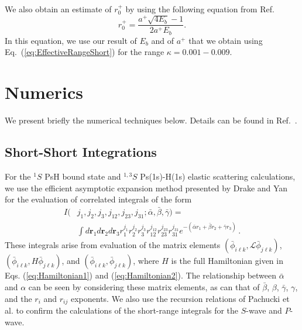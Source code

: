 \documentclass[preprint,showpacs,showkeys,preprintnumbers,amsmath,amssymb,longbibliography,pra,aps]{revtex4-1}
\begin{document}
We also obtain an estimate of $r_0^+$ by using the following
equation from Ref.~\cite{Blackwood2002}
\begin{equation}
\label{eq:BlackwoodERT}
r_0^+ = \frac{a^+ \sqrt{4 E_b} - 1}{2 a^+ E_b}.
\end{equation}
In this equation, we use our result of $E_b$ and of $a^+$ that we obtain using
Eq.~(\ref{eq:EffectiveRangeShort}) for the range $\kappa = 0.001 - 0.009$.


\section{Numerics}
\label{sec:Numerical}

We present briefly the numerical techniques below. Details
can be found in Ref.~\cite{WoodsDiss2015}.

\subsection{Short-Short Integrations}
\label{sec:ShortInt}
For the $^1S$ PsH bound state and $^{1,3}S$ Ps(1s)-H(1s) elastic scattering
calculations, we use
the efficient asymptotic expansion method presented by Drake and Yan
\cite{Drake1995} for the evaluation of correlated integrals of the form
\begin{align}
\label{eq:ShortInt}
I(&j_1,j_2,j_3,j_{12},j_{23},j_{31}; \bar{\alpha}, \bar{\beta}, \bar{\gamma}) =
  \nonumber \\
&\int
d \textbf{r}_1 d \textbf{r}_2 d \textbf{r}_3
r_1^{j_1} r_2^{j_2} r_3^{j_3} r_{12}^{j_{12}}
r_{23}^{j_{23}} r_{31}^{j_{31}}
e^{-(\bar{\alpha} r_1 + \bar{\beta} r_2 + \bar{\gamma} r_3)}\, .
\end{align}
These integrals arise from evaluation of the matrix elements
$(\bar{\phi}_{i\ell k}, \mathcal{L} \bar{\phi}_{j\ell k})$,
$(\bar{\phi}_{i\ell k}, H \bar{\phi}_{j\ell k})$,
and $(\bar{\phi}_{i\ell k}, \bar{\phi}_{j\ell k})$, where $H$
is the full Hamiltonian given in Eqs. (\ref{eq:Hamiltonian1}) and
(\ref{eq:Hamiltonian2}).
The relationship between $\bar{\alpha}$ and $\alpha$ can be seen by
considering these matrix elements, as can that of $\bar{\beta}$, $\beta$,
$\bar{\gamma}$, $\gamma$, and the $r_i$ and $r_{ij}$ exponents.
We also use the recursion relations of Pachucki
et al. \cite{Pachucki2004} to confirm the calculations of the short-range 
integrals for the $S$-wave and $P$-wave.
\end{document}

